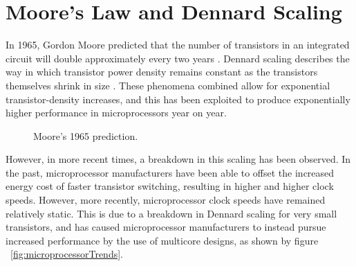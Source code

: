\documentclass{UoYCSproject}
\begin{document}
\section{Moore's Law and Dennard Scaling}

In 1965, Gordon Moore predicted that the number of transistors in an integrated circuit will double
approximately every two years  \cite{moore}. Dennard scaling describes the way in which transistor power density
remains constant as the transistors themselves shrink in size \cite{dennard}. These phenomena combined allow for exponential
transistor-density increases, and this has been exploited to produce exponentially higher performance in
microprocessors year on year.

\begin{figure}[h]
\caption{Moore's 1965 prediction. \cite{moore}}
\end{figure}

However, in more recent times, a breakdown in this scaling has been observed. In the past, microprocessor manufacturers have
been able to offset the increased energy cost of faster transistor switching, resulting in higher
and higher clock speeds. However, more recently, microprocessor clock speeds have remained relatively static. This is
due to a breakdown in Dennard scaling for very small transistors, and has caused microprocessor manufacturers to instead
pursue increased performance by the use of multicore designs, as shown by figure ~\ref{fig:microprocessorTrends}.
\end{document}
